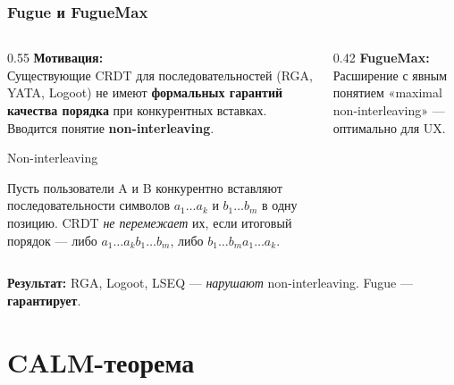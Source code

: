 \documentclass{beamer}
\newenvironment{definitionbox}[1][Определение]{%
  \begin{exampleblock}{#1}
}{%
  \end{exampleblock}
}
\begin{document}
\begin{frame}
\frametitle{Fugue и FugueMax}

\begin{columns}
\begin{column}{0.55\textwidth}
\textbf{Мотивация:}\\
Существующие CRDT для последовательностей (RGA, YATA, Logoot) не имеют \textbf{формальных гарантий качества порядка} при конкурентных вставках. Вводится понятие \textbf{non-interleaving}.

\medskip
\begin{definitionbox}[Non-interleaving]
\small Пусть пользователи A и B конкурентно вставляют последовательности символов $a_1\ldots a_k$ и $b_1\ldots b_m$ в одну позицию. CRDT \emph{не перемежает} их, если итоговый порядок — либо $a_1\ldots a_k b_1\ldots b_m$, либо $b_1\ldots b_m a_1\ldots a_k$.
\end{definitionbox}

\end{column}
\begin{column}{0.42\textwidth}
\textbf{FugueMax:}\\
Расширение с явным понятием «maximal non-interleaving» — оптимально для UX.

\medskip
{}
\end{column}
\end{columns}

\medskip
\textbf{Результат:} RGA, Logoot, LSEQ — \emph{нарушают} non-interleaving. Fugue — \textbf{гарантирует}.


\end{frame}

\section{CALM-теорема}
\end{document}
